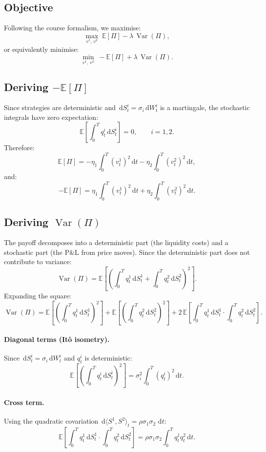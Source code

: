 \documentclass[12pt, a4paper]{article}
\newcommand{\E}{\mathbb{E}}
\newcommand{\Var}{\operatorname{Var}}
\newcommand{\dd}{\,\mathrm{d}}
\begin{document}
\subsection{Objective}

Following the course formalism, we maximise:
\[
  \max_{v^1,\,v^2}\;\E[\Pi] - \lambda\,\Var(\Pi),
\]
or equivalently minimise:
\[
  \min_{v^1,\,v^2}\;-\E[\Pi] + \lambda\,\Var(\Pi).
\]

\subsection{Deriving \texorpdfstring{$-\E[\Pi]$}{-E[Pi]}}

Since strategies are deterministic and $\dd S^i_t = \sigma_i \dd W^i_t$ is a
martingale, the stochastic integrals have zero expectation:
\[
  \E\!\left[\int_0^T q^i_t \dd S^i_t\right] = 0, \qquad i = 1, 2.
\]
Therefore:
\[
  \E[\Pi] = -\eta_1\int_0^T (v^1_t)^2 \dd t - \eta_2\int_0^T (v^2_t)^2 \dd t,
\]
and:
\begin{equation}
  -\E[\Pi] = \eta_1\int_0^T (v^1_t)^2 \dd t + \eta_2\int_0^T (v^2_t)^2 \dd t.
  \label{eq:neg-mean}
\end{equation}

\subsection{Deriving \texorpdfstring{$\Var(\Pi)$}{Var(Pi)}}

The payoff decomposes into a deterministic part (the liquidity costs) and a
stochastic part (the P\&L from price moves). Since the deterministic part
does not contribute to variance:
\[
  \Var(\Pi)
  = \E\!\left[
      \left(\int_0^T q^1_t \dd S^1_t + \int_0^T q^2_t \dd S^2_t\right)^{\!2}
    \right].
\]
Expanding the square:
\[
  \Var(\Pi)
  = \E\!\left[\left(\int_0^T q^1_t \dd S^1_t\right)^{\!2}\right]
  + \E\!\left[\left(\int_0^T q^2_t \dd S^2_t\right)^{\!2}\right]
  + 2\,\E\!\left[\int_0^T q^1_t \dd S^1_t \cdot \int_0^T q^2_t \dd S^2_t\right].
\]

\paragraph{Diagonal terms (It\^{o} isometry).}
Since $\dd S^i_t = \sigma_i \dd W^i_t$ and $q^i_t$ is deterministic:
\[
  \E\!\left[\left(\int_0^T q^i_t \dd S^i_t\right)^{\!2}\right]
  = \sigma_i^2 \int_0^T (q^i_t)^2 \dd t.
\]

\paragraph{Cross term.}
Using the quadratic covariation $\dd\langle S^1, S^2\rangle_t = \rho\sigma_1\sigma_2\,\dd t$:
\[
  \E\!\left[\int_0^T q^1_t \dd S^1_t \cdot \int_0^T q^2_t \dd S^2_t\right]
  = \rho\sigma_1\sigma_2\int_0^T q^1_t q^2_t \dd t.
\]
\end{document}
